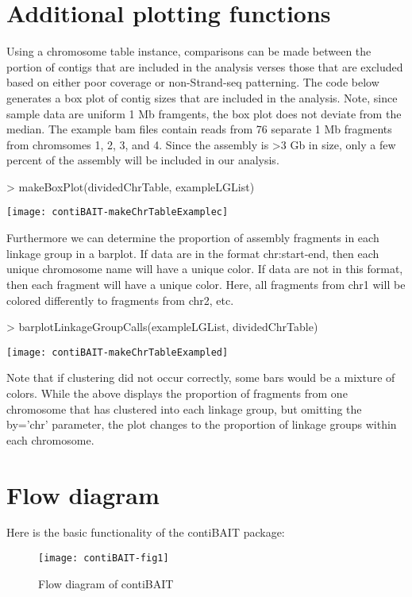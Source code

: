 \documentclass{article}
\begin{document}
\section{Additional plotting functions}

Using a chromosome table instance, comparisons can be made between the portion of contigs that are included in the analysis verses those that are excluded based on either poor coverage or non-Strand-seq patterning. The code below generates a box plot of contig sizes that are included in the analysis. Note, since sample data are uniform 1 Mb framgents, the box plot does not deviate from the median.  The example bam files contain reads from 76 separate 1 Mb fragments from chromsomes 1, 2, 3, and 4.  Since the assembly is >3 Gb in size, only a few percent of the assembly will be included in our analysis.

\begin{Schunk}
\begin{Sinput}
> makeBoxPlot(dividedChrTable, exampleLGList)
\end{Sinput}
\end{Schunk}
\texttt{[image: contiBAIT-makeChrTableExamplec]}

Furthermore we can determine the proportion of assembly fragments in each linkage group in a barplot. If data are in the format chr:start-end, then each unique chromosome name will have a unique color. If data are not in this format, then each fragment will have a unique color.  Here, all fragments from chr1 will be colored differently to fragments from chr2, etc.

\begin{Schunk}
\begin{Sinput}
> barplotLinkageGroupCalls(exampleLGList, dividedChrTable)
\end{Sinput}
\end{Schunk}
\texttt{[image: contiBAIT-makeChrTableExampled]}

Note that if clustering did not occur correctly, some bars would be a mixture of colors.  While the above displays the proportion of fragments from one chromosome that has clustered into each linkage group, but omitting the by='chr' parameter, the plot changes to the proportion of linkage groups within each chromosome.


\section{Flow diagram}
Here is the basic functionality of the contiBAIT package:


\begin{figure}
\begin{center}
\texttt{[image: contiBAIT-fig1]}

\end{center}
\caption{Flow diagram of contiBAIT}
\end{figure}
\end{document}
